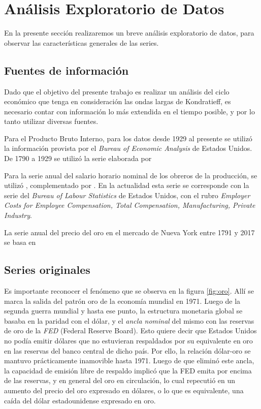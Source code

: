 \documentclass[a4paper]{article}
\begin{document}
\section{Análisis Exploratorio de Datos}
En la presente sección realizaremos un breve análisis exploratorio de datos, para observar las características generales de las series.

\subsection{Fuentes de información}

Dado que el objetivo del presente trabajo es realizar un análisis del ciclo económico que tenga en consideración las ondas largas de Kondratieff, es necesario contar con información lo más extendida en el tiempo posible, y por lo tanto utilizar diversas fuentes. 

Para el Producto Bruto Interno, para los datos desde 1929 al presente se utilizó la información provista por el \textit{Bureau of Economic Analysis} de Estados Unidos. De 1790 a 1929 se utilizó la serie elaborada por \cite{johnston2018us}

Para la serie anual del salario horario nominal de los obreros de la producción, se utilizó \citep{officer2009two}, complementado por \citep{Roesch2018}. En la actualidad esta serie se corresponde con la serie del \textit{Bureau of Labour Statistics} de Estados Unidos, con el rubro \textit{Employer Costs for Employee Compensation, Total Compensation, Manufacturing, Private Industry}.

La serie anual del precio del oro en el mercado de Nueva York entre 1791 y 2017 se basa en \cite{officer2018gold}


\subsection{Series originales}

Es importante reconocer el fenómeno que se observa en la figura \ref{fig:oro}. Allí se marca la salida del patrón oro de la economía mundial en 1971. Luego de la segunda guerra mundial y hasta ese punto, la estructura monetaria global se basaba en la paridad con el dólar, y el \textit{ancla nominal} del mismo con las reservas de oro de la \textit{FED} (Federal Reserve Board). Esto quiere decir que Estados Unidos no podía emitir dólares que no estuvieran respaldados por su equivalente en oro en las reservas del banco central de dicho país. Por ello, la relación dólar-oro se mantuvo prácticamente inamovible hasta 1971. Luego de que eliminó este ancla, la capacidad de emisión libre de respaldo implicó que la FED emita por encima de las reservas, y en general del oro en circulación, lo cual repecutió en un aumento del precio del oro expresado en dólares, o lo que es equivalente, una caída del dólar estadounidense expresado en oro.
\end{document}
